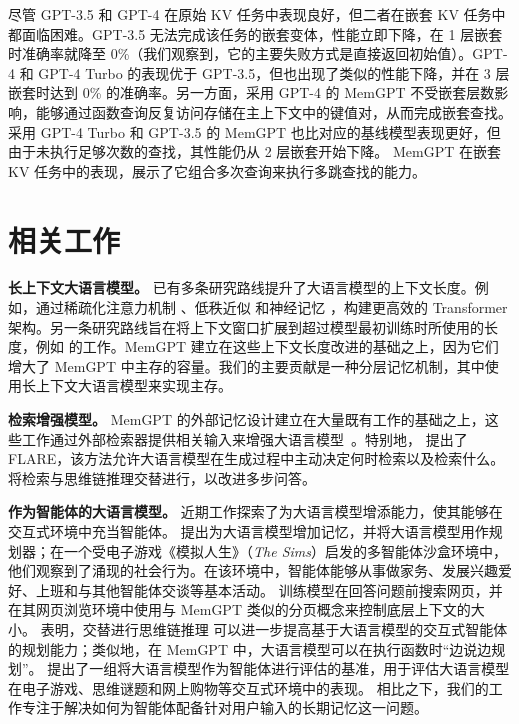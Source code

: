 \documentclass[UTF8,fontset=fandol,a4paper,11pt]{ctexart}
\newcommand{\ours}{MemGPT\xspace}
\begin{document}
尽管 GPT-3.5 和 GPT-4 在原始 KV 任务中表现良好，但二者在嵌套 KV 任务中都面临困难。GPT-3.5 无法完成该任务的嵌套变体，性能立即下降，在 1 层嵌套时准确率就降至 0\%（我们观察到，它的主要失败方式是直接返回初始值）。GPT-4 和 GPT-4 Turbo 的表现优于 GPT-3.5，但也出现了类似的性能下降，并在 3 层嵌套时达到 0\% 的准确率。另一方面，采用 GPT-4 的 \ours 不受嵌套层数影响，能够通过函数查询反复访问存储在主上下文中的键值对，从而完成嵌套查找。采用 GPT-4 Turbo 和 GPT-3.5 的 \ours 也比对应的基线模型表现更好，但由于未执行足够次数的查找，其性能仍从 2 层嵌套开始下降。
\ours 在嵌套 KV 任务中的表现，展示了它组合多次查询来执行多跳查找的能力。















\section{相关工作}

\textbf{长上下文大语言模型。}
已有多条研究路线提升了大语言模型的上下文长度。例如，通过稀疏化注意力机制 \citep{child2019generating, beltagy2020longformer}、低秩近似 \citep{wang2020linformer} 和神经记忆 \cite{lee2019set}，构建更高效的 Transformer 架构。另一条研究路线旨在将上下文窗口扩展到超过模型最初训练时所使用的长度，例如 \citet{alibi, chen2023extending} 的工作。\ours 建立在这些上下文长度改进的基础之上，因为它们增大了 \ours 中主存的容量。我们的主要贡献是一种分层记忆机制，其中使用长上下文大语言模型来实现主存。

\textbf{检索增强模型。}
\ours 的外部记忆设计建立在大量既有工作的基础之上，这些工作通过外部检索器提供相关输入来增强大语言模型~\cite{ram2023context, retro, fb-dense-retrieval, lewis2020retrieval, guu2020retrieval, radit}。特别地，\citet{jiang2023active} 提出了 FLARE，该方法允许大语言模型在生成过程中主动决定何时检索以及检索什么。\citet{Trivedi2022InterleavingRW} 将检索与思维链推理交替进行，以改进多步问答。

\textbf{作为智能体的大语言模型。}
近期工作探索了为大语言模型增添能力，使其能够在交互式环境中充当智能体。
\citet{park2023simulacra} 提出为大语言模型增加记忆，并将大语言模型用作规划器；在一个受电子游戏《模拟人生》（\emph{The Sims}）启发的多智能体沙盒环境中，他们观察到了涌现的社会行为。在该环境中，智能体能够从事做家务、发展兴趣爱好、上班和与其他智能体交谈等基本活动。
\citet{nakano2021webgpt} 训练模型在回答问题前搜索网页，并在其网页浏览环境中使用与 \ours 类似的分页概念来控制底层上下文的大小。
\citet{yao2022react} 表明，交替进行思维链推理 \citep{wei2022chainofthought} 可以进一步提高基于大语言模型的交互式智能体的规划能力；类似地，在 \ours 中，大语言模型可以在执行函数时“边说边规划”。%
\citet{liu2023agentbench} 提出了一组将大语言模型作为智能体进行评估的基准，用于评估大语言模型在电子游戏、思维谜题和网上购物等交互式环境中的表现。
相比之下，我们的工作专注于解决如何为智能体配备针对用户输入的长期记忆这一问题。
\end{document}
